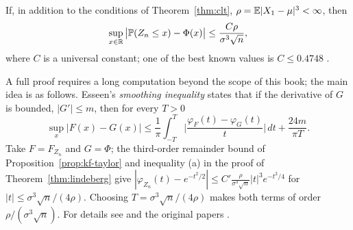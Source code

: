 \documentclass[main.tex]{subfiles}
\begin{document}
\begin{theorem}\label{thm:berry-esseen}
If, in addition to the conditions of Theorem~\ref{thm:clt}, $\rho=\mathbb{E}|X_1-\mu|^3<\infty$, then
\[
\sup_{x\in\mathbb{R}}\big|\mathbb{P}(Z_n\le x)-\Phi(x)\big|\le\frac{C\rho}{\sigma^3\sqrt n},
\]
where $C$ is a universal constant; one of the best known values is $C\le0.4748$ \cite{shevtsova11}.
\end{theorem}
\begin{remark}
A full proof requires a long computation beyond the scope of this book; the main idea is as follows. Esseen's \emph{smoothing inequality} states that if the derivative of $G$ is bounded, $|G'|\le m$, then for every $T>0$
\[
\sup_x|F(x)-G(x)|\le\frac1\pi\int_{-T}^{T}\Big|\frac{\varphi_F(t)-\varphi_G(t)}{t}\Big|\,dt+\frac{24m}{\pi T} .
\]
Take $F=F_{Z_n}$ and $G=\Phi$; the third-order remainder bound of Proposition~\ref{prop:kf-taylor} and inequality (a) in the proof of Theorem~\ref{thm:lindeberg} give $|\varphi_{Z_n}(t)-e^{-t^2/2}|\le C'\frac{\rho}{\sigma^3\sqrt n}|t|^3e^{-t^2/4}$ for $|t|\le\sigma^3\sqrt n/(4\rho)$. Choosing $T=\sigma^3\sqrt n/(4\rho)$ makes both terms of order $\rho/(\sigma^3\sqrt n)$. For details see \cite[Section~3.4]{durrett} and the original papers \cite{berry41,esseen42}.
\end{remark}
\end{document}
